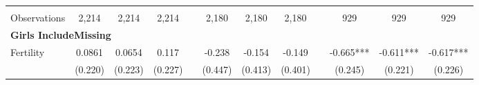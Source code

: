 \begin{landscape}
\begin{table}[htpb!]
\begin{center}
\begin{tabular}{lcccp{2mm}cccp{2mm}ccc}
\begin{footnotesize}\end{footnotesize}&\begin{footnotesize}\end{footnotesize}&\begin{footnotesize}\end{footnotesize}&\begin{footnotesize}\end{footnotesize}&\begin{footnotesize}\end{footnotesize}&\begin{footnotesize}\end{footnotesize}&\begin{footnotesize}\end{footnotesize}&\begin{footnotesize}\end{footnotesize}&\begin{footnotesize}\end{footnotesize}&\begin{footnotesize}\end{footnotesize}&\begin{footnotesize}\end{footnotesize}&\begin{footnotesize}\end{footnotesize}\\Observations&2,214&2,214&2,214&&2,180&2,180&2,180&&929&929&929\\
\multicolumn{12}{l}{\textbf{Girls IncludeMissing}}\\ 
Fertility&0.0861&0.0654&0.117&&-0.238&-0.154&-0.149&&-0.665***&-0.611***&-0.617***\\
&(0.220)&(0.223)&(0.227)&&(0.447)&(0.413)&(0.401)&&(0.245)&(0.221)&(0.226)\\

\end{tabular}
\end{center}
\end{table}
\end{landscape}
